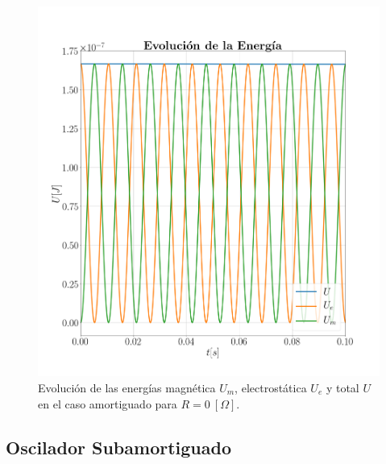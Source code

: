\documentclass[journal]{IEEEtran}
\begin{document}
\begin{figure}[!htb]
    \centering
    \includegraphics[width=\linewidth,trim={40 70 70 70},clip]{energiaamortiguado.png}
    \caption{Evolución de las energías magnética $U_m$, electrostática $U_e$ y total $U$ en el caso amortiguado para $R=0~[\Omega]$.}
    \label{fig:energiaamortiguado}
\end{figure}

\clearpage

\subsection{Oscilador Subamortiguado}
\label{subsec:osciladorsubamortiguado}
\end{document}
